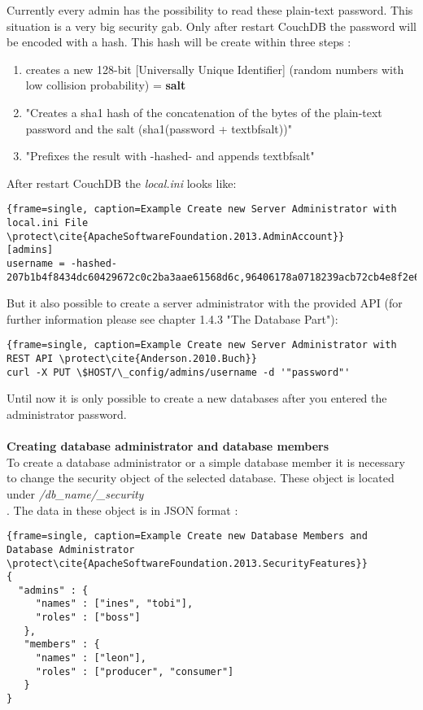 Currently every admin has the possibility to read these plain-text password. This situation is a very big security gab. Only after restart CouchDB the password will be encoded with a hash. This hash will be create within three steps \cite{Anderson.2010.Buch}:
\begin{enumerate}
\item creates a new 128-bit [Universally Unique Identifier] (random numbers with low collision probability) = \textbf{salt} \cite{Anderson.2010.Buch}
\item "Creates a sha1 hash of the concatenation of the bytes of the plain-text password and the salt (sha1(password + textbf{salt}))" \\ \cite{Anderson.2010.Buch}
\item "Prefixes the result with -hashed- and appends textbf{salt}" \\ \cite{Anderson.2010.Buch}
\end{enumerate}
After restart CouchDB the \textit{local.ini} looks like:
\begin{lstlisting}{frame=single, caption=Example Create new Server Administrator with local.ini File \protect\cite{ApacheSoftwareFoundation.2013.AdminAccount}}
[admins]
username = -hashed-207b1b4f8434dc60429672c0c2ba3aae61568d6c,96406178a0718239acb72cb4e8f2e66e
\end{lstlisting}
But it also possible to create a server administrator with the provided API (for further information please see chapter 1.4.3 "The Database Part"): \\ \cite{Anderson.2010.Buch}
\begin{lstlisting}{frame=single, caption=Example Create new Server Administrator with REST API \protect\cite{Anderson.2010.Buch}}
curl -X PUT \$HOST/\_config/admins/username -d '"password"'
\end{lstlisting} 

Until now it is only possible to create a new databases after you entered the administrator password. \\
\\
\textbf{Creating database administrator and database members}
\\
To create a database administrator or a simple database member it is necessary to change the security object of the selected database. These object is located under \textit{\slash db\_name\slash\_security} \\ \cite{ApacheSoftwareFoundation.2013.SecurityFeatures}.
The data in these object is in JSON format \cite{ApacheSoftwareFoundation.2013.SecurityFeatures}:
\begin{lstlisting}{frame=single, caption=Example Create new Database Members and Database Administrator \protect\cite{ApacheSoftwareFoundation.2013.SecurityFeatures}}
{
  "admins" : {
     "names" : ["ines", "tobi"],
     "roles" : ["boss"]
   },
   "members" : {
     "names" : ["leon"],
     "roles" : ["producer", "consumer"]
   }
}
\end{lstlisting}

